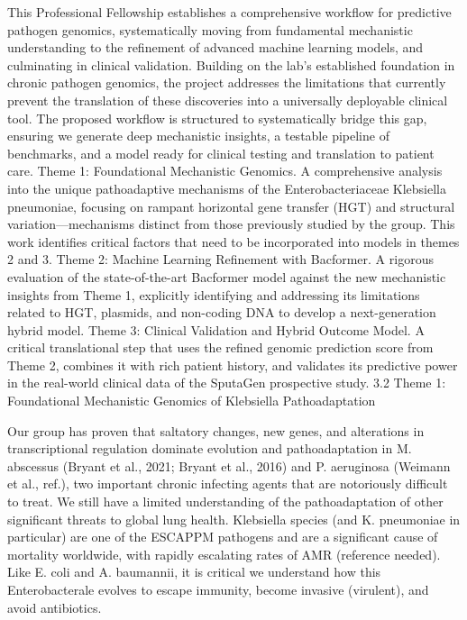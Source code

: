 This Professional Fellowship establishes a comprehensive workflow for predictive pathogen genomics, systematically moving from fundamental mechanistic understanding to the refinement of advanced machine learning models, and culminating in clinical validation. Building on the lab's established foundation in chronic pathogen genomics, the project addresses the limitations that currently prevent the translation of these discoveries into a universally deployable clinical tool. The proposed workflow is structured to systematically bridge this gap, ensuring we generate deep mechanistic insights, a testable pipeline of benchmarks, and a model ready for clinical testing and translation to patient care.
Theme 1: Foundational Mechanistic Genomics. A comprehensive analysis into the unique pathoadaptive mechanisms of the Enterobacteriaceae Klebsiella pneumoniae, focusing on rampant horizontal gene transfer (HGT) and structural variation—mechanisms distinct from those previously studied by the group. This work identifies critical factors that need to be incorporated into models in themes 2 and 3.
Theme 2: Machine Learning Refinement with Bacformer. A rigorous evaluation of the state-of-the-art Bacformer model against the new mechanistic insights from Theme 1, explicitly identifying and addressing its limitations related to HGT, plasmids, and non-coding DNA to develop a next-generation hybrid model.
Theme 3: Clinical Validation and Hybrid Outcome Model. A critical translational step that uses the refined genomic prediction score from Theme 2, combines it with rich patient history, and validates its predictive power in the real-world clinical data of the SputaGen prospective study.
3.2 Theme 1: Foundational Mechanistic Genomics of Klebsiella Pathoadaptation

Our group has proven that saltatory changes, new genes, and alterations in transcriptional regulation dominate evolution and pathoadaptation in M. abscessus (Bryant et al., 2021; Bryant et al., 2016) and P. aeruginosa (Weimann et al., ref.), two important chronic infecting agents that are notoriously difficult to treat. We still have a limited understanding of the pathoadaptation of other significant threats to global lung health. Klebsiella species (and K. pneumoniae in particular) are one of the ESCAPPM pathogens and are a significant cause of mortality worldwide, with rapidly escalating rates of AMR (reference needed). Like E. coli and A. baumannii, it is critical we understand how this Enterobacterale evolves to escape immunity, become invasive (virulent), and avoid antibiotics.

